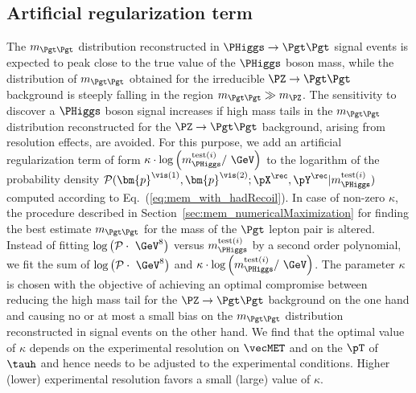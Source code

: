 \subsection{Artificial regularization term}
\label{sec:mem_logM}

The $m_{\Pgt\Pgt}$ distribution reconstructed in $\PHiggs \to \Pgt\Pgt$ signal events is expected to peak close to the true value of the $\PHiggs$ boson mass,
while the distribution of $m_{\Pgt\Pgt}$ obtained for the irreducible
$\PZ \to \Pgt\Pgt$ background is steeply falling in the region
$m_{\Pgt\Pgt} \gg m_{\PZ}$.
The sensitivity to discover a $\PHiggs$ boson signal increases if high mass tails in the $m_{\Pgt\Pgt}$ distribution reconstructed 
for the $\PZ \to \Pgt\Pgt$ background, arising from resolution effects, are avoided.
For this purpose,
we add an artificial regularization term of form 
$\kappa \cdot \log \left( m_{\PHiggs}^{\textrm{test}(i)} / \mbox{~\GeV} \right)$ 
to the logarithm of the probability density $\mathcal{P}(\bm{p}^{\vis(1)},\bm{p}^{\vis(2)};\pX^{\rec},\pY^{\rec}|m_{\PHiggs}^{\textrm{test}(i)})$
computed according to Eq.~(\ref{eq:mem_with_hadRecoil}).
In case of non-zero $\kappa$,
the procedure described in Section~\ref{sec:mem_numericalMaximization} for finding the best estimate $m_{\Pgt\Pgt}$ for the mass of the $\Pgt$ lepton pair is altered.
Instead of fitting 
$\log \left( \mathcal{P} \cdot \mbox{~\GeV}^{8} \right)$ 
versus $m_{\PHiggs}^{\textrm{test}(i)}$ by a second order polynomial,
we fit the sum of $\log \left( \mathcal{P} \cdot \mbox{~\GeV}^{8} \right)$
and $\kappa \cdot \log \left( m_{\PHiggs}^{\textrm{test}(i)} / \mbox{~\GeV} \right)$.
The parameter $\kappa$ is chosen with the objective of achieving an
optimal compromise between reducing the high mass tail for the
$\PZ \to \Pgt\Pgt$ background on the one hand and 
causing no or at most a small bias on the $m_{\Pgt\Pgt}$ distribution
reconstructed in signal events on the other hand.
We find that the optimal value of $\kappa$ depends on the experimental
resolution on $\vecMET$ and on the $\pT$ of $\tauh$ and hence needs to be adjusted to the experimental conditions.
Higher (lower) experimental resolution favors a small (large) value of $\kappa$. 
